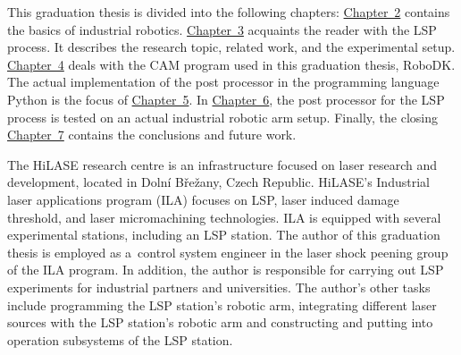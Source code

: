 This graduation thesis is divided into the following chapters: \hyperref[chap:basics]{Chapter~2} contains the basics of industrial robotics. \hyperref[chap:peening]{Chapter~3} acquaints the reader with the LSP process.  It describes the research topic, related work, and the experimental setup.  
\hyperref[chap:design]{Chapter~4} deals with the CAM program used in this graduation thesis, RoboDK. The actual implementation of the post processor in the programming language Python is the focus of \hyperref[chap:implementation]{Chapter~5}. In \hyperref[chap:testing]{Chapter~6}, the post processor for the LSP process is tested on an actual industrial robotic arm setup. Finally, the closing \hyperref[chap:discussion]{Chapter~7} contains the conclusions and future work. 

The HiLASE research centre is an infrastructure focused on laser research and development, located in Dolní Břežany, Czech Republic. HiLASE's Industrial laser applications program (ILA) focuses on LSP, laser induced damage threshold, and laser micromachining technologies. ILA is equipped with several experimental stations, including an LSP station. The author of this graduation thesis is employed as a~control system engineer in the laser shock peening group of the ILA program. In addition, the author is responsible for carrying out LSP experiments for industrial partners and universities. The author's other tasks include programming the LSP station's robotic arm, integrating different laser sources with the  LSP station's robotic arm and constructing and putting into operation subsystems of the LSP station.




